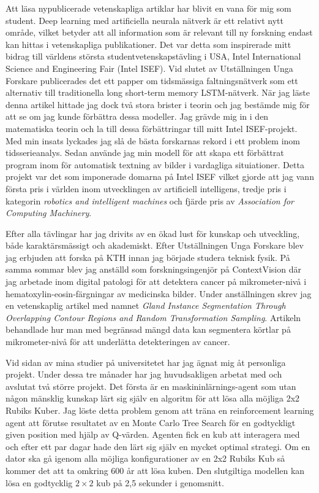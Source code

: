 \documentclass[11pt,a4paper]{article} %
\begin{document}
Att läsa nypublicerade vetenskapliga artiklar har blivit en vana för mig som student. Deep learning med artificiella neurala nätverk är ett relativt nytt område, vilket betyder att all information som är relevant till ny forskning endast kan hittas i vetenskapliga publikationer. Det var detta som inspirerade mitt bidrag till världens största studentvetenskapstävling i USA, Intel International Science and Engineering Fair (Intel ISEF). Vid slutet av Utställningen Unga Forskare publicerades det ett papper om tidsmässiga faltningsnätverk som ett alternativ till traditionella long short-term memory LSTM-nätverk. När jag läste denna artikel hittade jag dock två stora brister i teorin och jag bestämde mig för att se om jag kunde förbättra dessa modeller. Jag grävde mig in i den matematiska teorin och la till dessa förbättringar till mitt Intel ISEF-projekt. Med min insats lyckades jag slå de bästa forskarnas rekord i ett problem inom tidsserieanalys. Sedan använde jag min modell för att skapa ett förbättrat program inom för automatisk textning av bilder i vardagliga situiationer. Detta projekt var det som imponerade domarna på Intel ISEF vilket gjorde att jag vann första pris i världen inom utvecklingen av artificiell intelligens, tredje pris i kategorin \textit{robotics and intelligent machines} och fjärde pris av \textit{Association for Computing Machinery}. 

Efter alla tävlingar har jag drivits av en ökad lust för kunskap och utveckling, både karaktärsmässigt och akademiskt. Efter Utställningen Unga Forskare blev jag erbjuden att forska på KTH innan jag började studera teknisk fysik. På samma sommar blev jag anställd som forskningsingenjör på ContextVision där jag arbetade inom digital patologi för att detektera cancer på mikrometer-nivå i hematoxylin-eosin-färgningar av medicinska bilder. Under anställningen skrev jag en vetenskaplig artikel med namnet \textit{Gland Instance Segmentation Through Overlapping Contour Regions and Random Transformation Sampling}. Artikeln behandlade hur man med begränsad mängd data kan segmentera körtlar på mikrometer-nivå för att underlätta detekteringen av cancer.

Vid sidan av mina studier på universitetet har jag ägnat mig åt personliga projekt. Under dessa tre månader har jag huvudsakligen arbetat med och avslutat två större projekt. Det första är en maskininlärnings-agent som utan någon mänsklig kunskap lärt sig själv en algoritm för att lösa alla möjliga 2x2 Rubiks Kuber. Jag löste detta problem genom att träna en reinforcement learning agent att förutse resultatet av en Monte Carlo Tree Search för en godtyckligt given position med hjälp av Q-värden. Agenten fick en kub att interagera med och efter ett par dagar hade den lärt sig själv en mycket optimal strategi. Om en dator ska gå igenom alla möjliga konfigurationer av en 2x2 Rubiks Kub så kommer det att ta omkring 600 år att lösa kuben.  Den slutgiltiga modellen kan lösa en godtycklig $2 \times 2$ kub på 2,5 sekunder i genomsnitt. 
\end{document}
